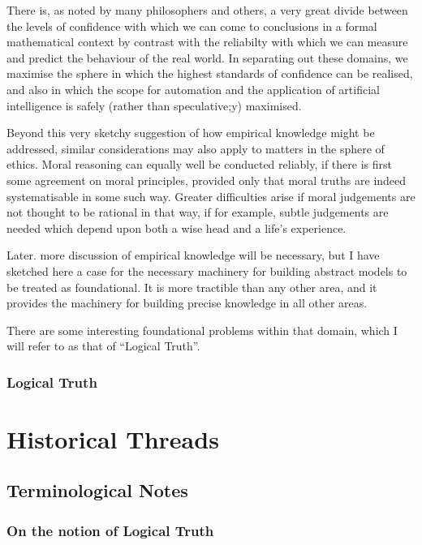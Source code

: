 \documentclass[10pt,titlepage]{book}
\begin{document}
There is, as noted by many philosophers and others, a very great divide between the levels of confidence with which we can come to conclusions in a formal mathematical context by contrast with the reliabilty with which we can measure and predict the behaviour of the real world.
In separating out these domains, we maximise the sphere in which the highest standards of confidence can be realised, and also in which the scope for automation and the application of artificial intelligence is safely (rather than speculative;y) maximised.

Beyond this very sketchy suggestion of how empirical knowledge might be addressed, similar considerations may also apply to matters in the sphere of ethics.
Moral reasoning can equally well be conducted reliably, if there is first some agreement on moral principles, provided only that moral truths are indeed systematisable in some such way.
Greater difficulties arise if moral judgements are not thought to be rational in that way, if for example, subtle judgements are needed which depend upon both a wise head and a life's experience.

Later. more discussion of empirical knowledge will be necessary, but I have sketched here a case for the necessary machinery for building abstract models to be treated as foundational.
It is more tractible than any other area, and it provides the machinery for building precise knowledge in all other areas.

There are some interesting foundational problems within that domain, which I will refer to as that of ``Logical Truth''.

\section{Logical Truth}

\part{Historical Threads}

\chapter{Terminological Notes}

\section{On the notion of Logical Truth}
\end{document}
